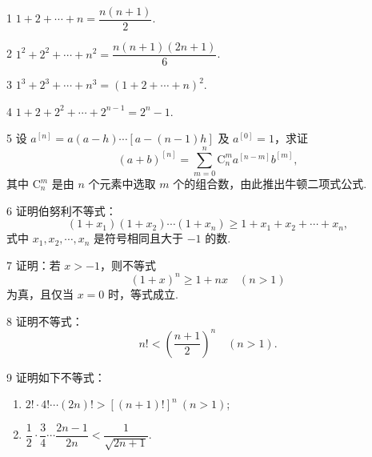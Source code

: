 


\begin{prob}[M]{1}
$1 + 2 + \cdots + n = \dfrac{n(n+1)}{2}$.
\end{prob}

\begin{prob}[M]{2}
$1^2 + 2^2 + \cdots + n^2 = \dfrac{n(n+1)(2n+1)}{6}$.
\end{prob}

\begin{prob}[M]{3}
$1^3 + 2^3 + \cdots + n^3 = (1 + 2 + \cdots + n)^2$.
\end{prob}

\begin{prob}[M]{4}
$1 + 2 + 2^2 + \cdots + 2^{n-1} = 2^n - 1$.
\end{prob}

\begin{prob}[M]{5}
设 $a^{[n]} = a(a-h)\cdots[a-(n-1)h]$ 及 $a^{[0]} = 1$，求证
\[
(a+b)^{[n]} = \sum_{m=0}^{n} \mathrm{C}_n^m a^{[n-m]} b^{[m]},
\]
其中 $\mathrm{C}_n^m$ 是由 $n$ 个元素中选取 $m$ 个的组合数，由此推出牛顿二项式公式.
\end{prob}

\begin{prob}[M]{6}
证明伯努利不等式：
\[
(1+x_1)(1+x_2)\cdots(1+x_n) \geqslant 1 + x_1 + x_2 + \cdots + x_n,
\]
式中 $x_1, x_2, \cdots, x_n$ 是符号相同且大于 $-1$ 的数.
\end{prob}

\begin{prob}[M]{7}
证明：若 $x > -1$，则不等式
\[
(1+x)^n \geqslant 1 + nx \quad (n > 1)
\]
为真，且仅当 $x = 0$ 时，等式成立.
\end{prob}

\begin{prob}[M]{8}
证明不等式：
\[
n! < \left(\frac{n+1}{2}\right)^n \quad (n > 1).
\]
\end{prob}

\begin{prob}[M]{9}
证明如下不等式：
\begin{enumerate}[label=(\alph*), itemsep=2pt, topsep=3pt]
  \item $2! \cdot 4! \cdots (2n)! > [(n+1)!]^n \ (n > 1)$;
  \item $\dfrac{1}{2} \cdot \dfrac{3}{4} \cdots \dfrac{2n-1}{2n} < \dfrac{1}{\sqrt{2n+1}}$.
\end{enumerate}
\end{prob}

